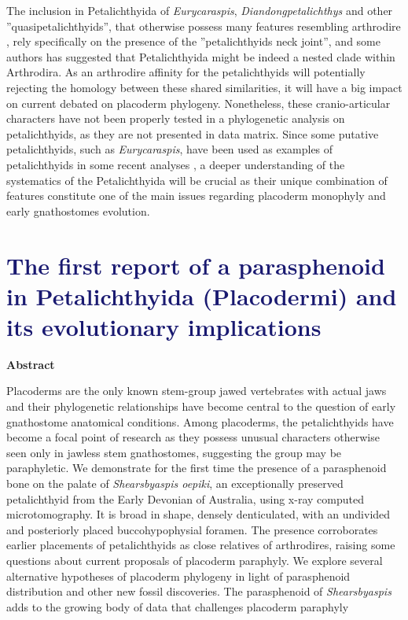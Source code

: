 \documentclass[11pt,letterpaper]{report}
\begin{document}
The inclusion in Petalichthyida of \textit{Eurycaraspis}, \textit{Diandongpetalichthys} and other ''quasipetalichthyids'', that otherwise possess many features resembling arthrodire \citep{Zhu1991,pan2015new}, rely specifically on the presence of the ''petalichthyids neck joint'', and some authors has suggested that Petalichthyida might be indeed a nested clade within Arthrodira. As an arthrodire affinity for the petalichthyids will potentially rejecting the homology between these shared similarities, it will have a big impact on current debated on placoderm phylogeny. Nonetheless, these cranio-articular characters have not been properly tested in a phylogenetic analysis on petalichthyids, as they are not presented in \cite{pan2015new} data matrix. Since some putative petalichthyids, such as \textit{Eurycaraspis}, have been used as examples of petalichthyids in some recent analyses \citep{dupret2004phylogenetic,Dupret2007,Dupret2009}, a deeper understanding of the systematics of the Petalichthyida will be crucial as their unique combination of features constitute one of the main issues regarding placoderm monophyly and early gnathostomes evolution.

\newpage
\chapter{\LARGE{\textcolor{MidnightBlue}{The first report of a parasphenoid in Petalichthyida (Placodermi) and its evolutionary implications}}}

\begin{center}
\textbf{Abstract}
\end{center}

\begin{small}Placoderms are the only known stem-group jawed vertebrates with actual jaws and their phylogenetic relationships have become central to the question of early gnathostome anatomical conditions. Among placoderms, the petalichthyids have become a focal point of research as they possess unusual characters otherwise seen only in jawless stem gnathostomes, suggesting the group may be paraphyletic. We demonstrate for the first time the presence of a parasphenoid bone on the palate of \textit{Shearsbyaspis oepiki}, an exceptionally preserved petalichthyid from the Early Devonian of Australia, using x-ray computed microtomography. It is broad in shape, densely denticulated, with an undivided and posteriorly placed buccohypophysial foramen. The presence corroborates earlier placements of petalichthyids as close relatives of arthrodires, raising some questions about current proposals of placoderm paraphyly. We explore several alternative hypotheses of placoderm phylogeny in light of parasphenoid distribution and other new fossil discoveries. The parasphenoid of \textit{Shearsbyaspis} adds to the growing body of data that challenges placoderm paraphyly
\end{small}
\end{document}
